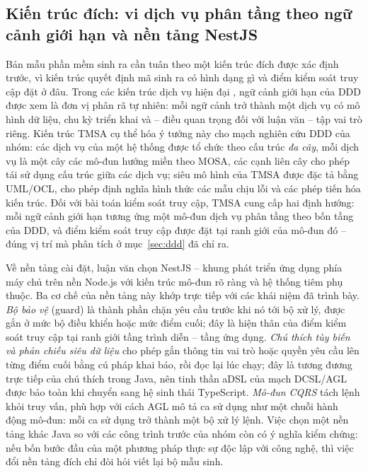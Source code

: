 \subsection{Kiến trúc đích: vi dịch vụ phân tầng theo ngữ cảnh giới hạn và nền tảng NestJS}

Bản mẫu phần mềm sinh ra cần tuân theo một kiến trúc đích được xác định trước, vì kiến trúc quyết định mã sinh ra có hình dạng gì và điểm kiểm soát truy cập đặt ở đâu. Trong các kiến trúc dịch vụ hiện đại \cite{newman2021,richardson2018}, ngữ cảnh giới hạn của DDD được xem là đơn vị phân rã tự nhiên: mỗi ngữ cảnh trở thành một dịch vụ có mô hình dữ liệu, chu kỳ triển khai và -- điều quan trọng đối với luận văn -- tập vai trò riêng. Kiến trúc TMSA \cite{le2025tmsa} cụ thể hóa ý tưởng này cho mạch nghiên cứu DDD của nhóm: các dịch vụ của một hệ thống được tổ chức theo cấu trúc \emph{đa cây}, mỗi dịch vụ là một cây các mô-đun hướng miền theo MOSA, các cạnh liên cây cho phép tái sử dụng cấu trúc giữa các dịch vụ; siêu mô hình của TMSA được đặc tả bằng UML/OCL, cho phép định nghĩa hình thức các mẫu chịu lỗi và các phép tiến hóa kiến trúc. Đối với bài toán kiểm soát truy cập, TMSA cung cấp hai định hướng: mỗi ngữ cảnh giới hạn tương ứng một mô-đun dịch vụ phân tầng theo bốn tầng của DDD, và điểm kiểm soát truy cập được đặt tại ranh giới của mô-đun đó -- đúng vị trí mà phân tích ở mục~\ref{sec:ddd} đã chỉ ra.

Về nền tảng cài đặt, luận văn chọn NestJS \cite{nestjs2025} -- khung phát triển ứng dụng phía máy chủ trên nền Node.js với kiến trúc mô-đun rõ ràng và hệ thống tiêm phụ thuộc. Ba cơ chế của nền tảng này khớp trực tiếp với các khái niệm đã trình bày. \emph{Bộ bảo vệ} (guard) là thành phần chặn yêu cầu trước khi nó tới bộ xử lý, được gắn ở mức bộ điều khiển hoặc mức điểm cuối; đây là hiện thân của điểm kiểm soát truy cập tại ranh giới tầng trình diễn -- tầng ứng dụng. \emph{Chú thích tùy biến và phản chiếu siêu dữ liệu} cho phép gắn thông tin vai trò hoặc quyền yêu cầu lên từng điểm cuối bằng cú pháp khai báo, rồi đọc lại lúc chạy; đây là tương đương trực tiếp của chú thích trong Java, nên tinh thần aDSL của mạch DCSL/AGL được bảo toàn khi chuyển sang hệ sinh thái TypeScript. \emph{Mô-đun CQRS} tách lệnh khỏi truy vấn, phù hợp với cách AGL mô tả ca sử dụng như một chuỗi hành động mô-đun: mỗi ca sử dụng trở thành một bộ xử lý lệnh. Việc chọn một nền tảng khác Java so với các công trình trước của nhóm còn có ý nghĩa kiểm chứng: nếu bốn bước đầu của một phương pháp thực sự độc lập với công nghệ, thì việc đổi nền tảng đích chỉ đòi hỏi viết lại bộ mẫu sinh.

